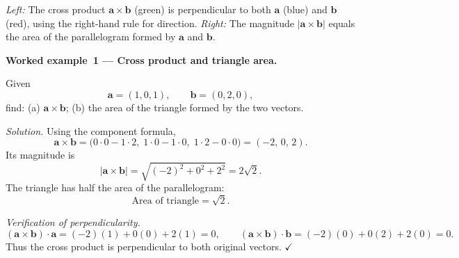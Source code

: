 \begin{center}
\end{center}

\vspace{0.5em}
\noindent\textit{Left:} The cross product
$\mathbf{a}\times\mathbf{b}$ (green) is perpendicular to both
$\mathbf{a}$ (blue) and $\mathbf{b}$ (red), using the right-hand
rule for direction.
\textit{Right:} The magnitude $|\mathbf{a}\times\mathbf{b}|$ equals
the area of the parallelogram formed by $\mathbf{a}$ and $\mathbf{b}$.

\vspace{0.8em}
\noindent\textbf{Worked example~1 --- Cross product and triangle area.}

\noindent Given
\[
  \mathbf{a} = (1,0,1),
  \qquad
  \mathbf{b} = (0,2,0),
\]
find: (a) $\mathbf{a}\times\mathbf{b}$; \quad
      (b) the area of the triangle formed by the two vectors.

\vspace{0.3em}
\noindent\textit{Solution.}
Using the component formula,
\[
  \mathbf{a} \times \mathbf{b}
  = \bigl(0\cdot 0 - 1\cdot 2,\;
         1\cdot 0 - 1\cdot 0,\;
         1\cdot 2 - 0\cdot 0\bigr)
  = \boxed{(-2,\, 0,\, 2)}.
\]
Its magnitude is
\[
  |\mathbf{a} \times \mathbf{b}|
  = \sqrt{(-2)^{2} + 0^{2} + 2^{2}}
  = 2\sqrt{2}.
\]
The triangle has half the area of the parallelogram:
\[
  \boxed{\text{Area of triangle} = \sqrt{2}}.
\]

\noindent\textit{Verification of perpendicularity.}
\[
  (\mathbf{a} \times \mathbf{b}) \cdot \mathbf{a}
  = (-2)(1) + 0(0) + 2(1) = 0, \qquad
  (\mathbf{a} \times \mathbf{b}) \cdot \mathbf{b}
  = (-2)(0) + 0(2) + 2(0) = 0.
\]
Thus the cross product is perpendicular to both original vectors.
$\checkmark$


